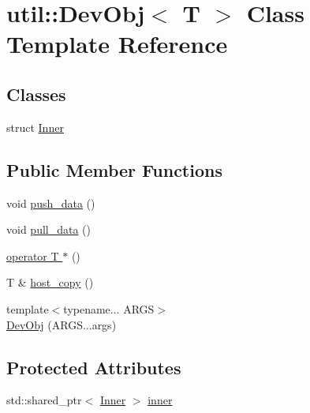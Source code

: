 \hypertarget{classutil_1_1DevObj}{\section{util\-:\-:Dev\-Obj$<$ T $>$ Class Template Reference}
\label{classutil_1_1DevObj}
}
\subsection*{Classes}
\begin{DoxyCompactItemize}
\item 
struct \hyperlink{structutil_1_1DevObj_1_1Inner}{Inner}
\end{DoxyCompactItemize}
\subsection*{Public Member Functions}
\begin{DoxyCompactItemize}
\item 
void \hyperlink{classutil_1_1DevObj_a865a13624a1d708cc15874fd257ef524}{push\-\_\-data} ()
\item 
void \hyperlink{classutil_1_1DevObj_a7622939893872b2f8e56f174bee13622}{pull\-\_\-data} ()
\item 
\hyperlink{classutil_1_1DevObj_ae842fa35d38551251eef67ab114d7ba2}{operator T $\ast$} ()
\item 
T \& \hyperlink{classutil_1_1DevObj_aa33c73fc492b19df5f8d123f952f5ac5}{host\-\_\-copy} ()
\item 
{\footnotesize template$<$typename... A\-R\-G\-S$>$ }\\\hyperlink{classutil_1_1DevObj_a3e9d281a29d74df3fb9c9e679d01523e}{Dev\-Obj} (A\-R\-G\-S...\-args)
\end{DoxyCompactItemize}
\subsection*{Protected Attributes}
\begin{DoxyCompactItemize}
\item 
std\-::shared\-\_\-ptr$<$ \hyperlink{structutil_1_1DevObj_1_1Inner}{Inner} $>$ \hyperlink{classutil_1_1DevObj_aecd3f69214e3c54f063e03e197a7edb1}{inner}
\end{DoxyCompactItemize}


